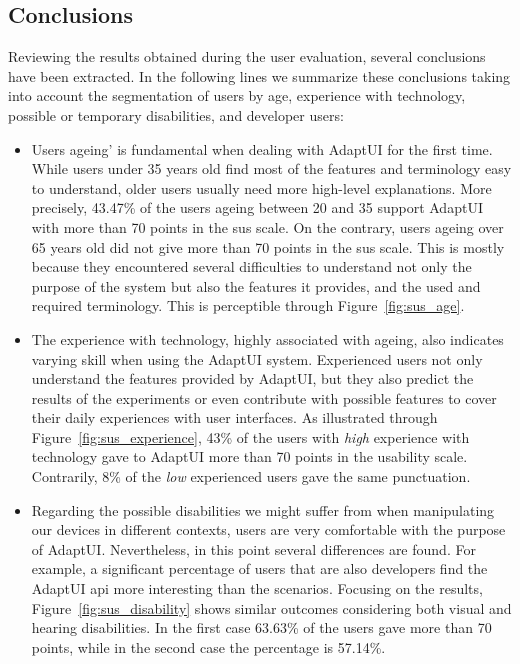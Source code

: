 \subsection{Conclusions}
\label{sec:user_evaluation_conclusions}

Reviewing the results obtained during the user evaluation, several conclusions 
have been extracted. In the following lines we summarize these conclusions taking 
into account the segmentation of users by age, experience with technology, possible 
or temporary disabilities, and developer users:

\begin{itemize}
  \item Users ageing' is fundamental when dealing with AdaptUI for the first 
  time. While users under 35 years old find most of the features and terminology 
  easy to understand, older users usually need more high-level explanations. 
  More precisely, 43.47\% of the users ageing between 20 and 35 support AdaptUI 
  with more than 70 points in the \ac{sus} scale. On the contrary, users ageing 
  over 65 years old did not give more than 70 points in the \ac{sus} scale. This 
  is mostly because they encountered several difficulties to understand not only 
  the purpose of the system but also the features it provides, and the used and 
  required terminology. This is perceptible through Figure~\ref{fig:sus_age}.
  
  \item The experience with technology, highly associated with ageing, also 
  indicates varying skill when using the AdaptUI system. Experienced users
  not only understand the features provided by AdaptUI, but they also predict
  the results of the experiments or even contribute with possible features to 
  cover their daily experiences with user interfaces. As illustrated through
  Figure~\ref{fig:sus_experience}, 43\% of the users with \textit{high} 
  experience with technology gave to AdaptUI more than 70 points in the 
  usability scale. Contrarily, 8\% of the \textit{low} experienced users gave
  the same punctuation.
  
  \item Regarding the possible disabilities we might suffer from when 
  manipulating our devices in different contexts, users are very comfortable 
  with the purpose of AdaptUI. Nevertheless, in this point several differences
  are found. For example, a significant percentage of users that are
  also developers find the AdaptUI \ac{api} more interesting than the scenarios. 
  Focusing on the results, Figure~\ref{fig:sus_disability} shows similar outcomes 
  considering both visual and hearing disabilities. In the first case 63.63\% of 
  the  users gave more than 70 points, while in the second case the percentage 
  is 57.14\%.
  

\end{itemize}
